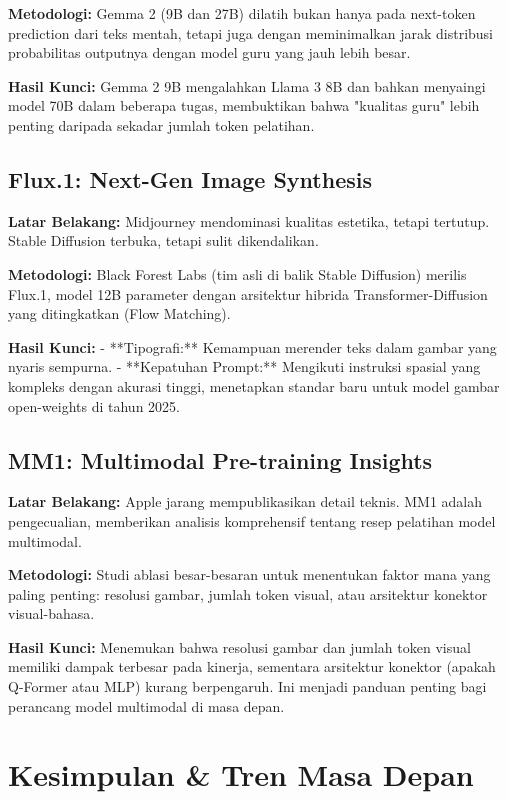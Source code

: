 \textbf{Metodologi:}
Gemma 2 (9B dan 27B) dilatih bukan hanya pada next-token prediction dari teks mentah, tetapi juga dengan meminimalkan jarak distribusi probabilitas outputnya dengan model guru yang jauh lebih besar.

\textbf{Hasil Kunci:}
Gemma 2 9B mengalahkan Llama 3 8B dan bahkan menyaingi model 70B dalam beberapa tugas, membuktikan bahwa "kualitas guru" lebih penting daripada sekadar jumlah token pelatihan.

\subsection{Flux.1: Next-Gen Image Synthesis \cite{black2024flux}}
\textbf{Latar Belakang:}
Midjourney mendominasi kualitas estetika, tetapi tertutup. Stable Diffusion terbuka, tetapi sulit dikendalikan.

\textbf{Metodologi:}
Black Forest Labs (tim asli di balik Stable Diffusion) merilis Flux.1, model 12B parameter dengan arsitektur hibrida Transformer-Diffusion yang ditingkatkan (Flow Matching).

\textbf{Hasil Kunci:}
- **Tipografi:** Kemampuan merender teks dalam gambar yang nyaris sempurna.
- **Kepatuhan Prompt:** Mengikuti instruksi spasial yang kompleks dengan akurasi tinggi, menetapkan standar baru untuk model gambar open-weights di tahun 2025.

\subsection{MM1: Multimodal Pre-training Insights \cite{apple2024mm1}}
\textbf{Latar Belakang:}
Apple jarang mempublikasikan detail teknis. MM1 adalah pengecualian, memberikan analisis komprehensif tentang resep pelatihan model multimodal.

\textbf{Metodologi:}
Studi ablasi besar-besaran untuk menentukan faktor mana yang paling penting: resolusi gambar, jumlah token visual, atau arsitektur konektor visual-bahasa.

\textbf{Hasil Kunci:}
Menemukan bahwa resolusi gambar dan jumlah token visual memiliki dampak terbesar pada kinerja, sementara arsitektur konektor (apakah Q-Former atau MLP) kurang berpengaruh. Ini menjadi panduan penting bagi perancang model multimodal di masa depan.

\section{Kesimpulan \& Tren Masa Depan}

